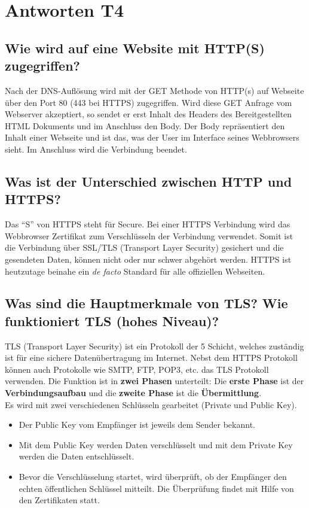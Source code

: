 \pagebreak
\section{Antworten T4}
\subsection*{Wie wird auf eine Website mit HTTP(S) zugegriffen?}
Nach der DNS-Auflösung wird mit der GET Methode von HTTP(s) auf Webseite über den Port 80 (443 bei HTTPS) zugegriffen. Wird diese GET Anfrage vom Webserver akzeptiert, so sendet er erst Inhalt des Headers des Bereitgestellten HTML Dokuments und im Anschluss den Body. Der Body repräsentiert den Inhalt einer Webseite und ist das, was der User im Interface seines Webbrowsers sieht. Im Anschluss wird die Verbindung beendet.

\subsection*{Was ist der Unterschied zwischen HTTP und HTTPS?}
Das "`S"' von HTTPS steht für Secure. Bei einer HTTPS Verbindung wird das Webbrowser Zertifikat zum Verschlüsseln der Verbindung verwendet. Somit ist die Verbindung über SSL/TLS (Transport Layer Security) gesichert und die gesendeten Daten, können nicht oder nur schwer abgehört werden. HTTPS ist heutzutage beinahe ein \textsl{de facto} Standard für alle offiziellen Webseiten.

\subsection*{Was sind die Hauptmerkmale von TLS? Wie funktioniert TLS (hohes Niveau)?}
TLS (Transport Layer Security) ist ein Protokoll der 5 Schicht, welches zuständig ist für eine sichere Datenübertragung im Internet. Nebst dem HTTPS Protokoll können auch Protokolle wie SMTP, FTP, POP3, etc. das TLS Protokoll verwenden. Die Funktion ist in \textbf{zwei Phasen} unterteilt: Die \textbf{erste Phase} ist der \textbf{Verbindungsaufbau} und die \textbf{zweite Phase} ist die \textbf{Übermittlung}.\\[1em]

Es wird mit zwei verschiedenen Schlüsseln gearbeitet (Private und Public Key).
\begin{itemize}
    \item Der Public Key vom Empfänger ist jeweils dem Sender bekannt.
    \item Mit dem Public Key werden Daten verschlüsselt und mit dem Private Key werden die Daten entschlüsselt.
    \item Bevor die Verschlüsselung startet, wird überprüft, ob der Empfänger den echten öffentlichen Schlüssel mitteilt. Die Überprüfung findet mit Hilfe von den Zertifikaten statt.
\end{itemize}

